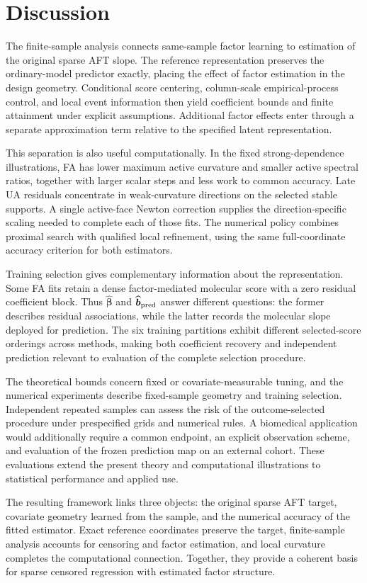 \section{Discussion}
\label{sec:discussion}
The finite-sample analysis connects same-sample factor learning to estimation of the original sparse AFT slope. The reference representation preserves the ordinary-model predictor exactly, placing the effect of factor estimation in the design geometry. Conditional score centering, column-scale empirical-process control, and local event information then yield coefficient bounds and finite attainment under explicit assumptions. Additional factor effects enter through a separate approximation term relative to the specified latent representation.

This separation is also useful computationally. In the fixed strong-dependence illustrations, FA has lower maximum active curvature and smaller active spectral ratios, together with larger scalar steps and less work to common accuracy. Late UA residuals concentrate in weak-curvature directions on the selected stable supports. A single active-face Newton correction supplies the direction-specific scaling needed to complete each of those fits. The numerical policy combines proximal search with qualified local refinement, using the same full-coordinate accuracy criterion for both estimators.

Training selection gives complementary information about the representation. Some FA fits retain a dense factor-mediated molecular score with a zero residual coefficient block. Thus $\widehat{\bm{\beta}}$ and $\widehat{\bm{b}}_{\rm pred}$ answer different questions: the former describes residual associations, while the latter records the molecular slope deployed for prediction. The six training partitions exhibit different selected-score orderings across methods, making both coefficient recovery and independent prediction relevant to evaluation of the complete selection procedure.

The theoretical bounds concern fixed or covariate-measurable tuning, and the numerical experiments describe fixed-sample geometry and training selection. Independent repeated samples can assess the risk of the outcome-selected procedure under prespecified grids and numerical rules. A biomedical application would additionally require a common endpoint, an explicit observation scheme, and evaluation of the frozen prediction map on an external cohort. These evaluations extend the present theory and computational illustrations to statistical performance and applied use.

The resulting framework links three objects: the original sparse AFT target, covariate geometry learned from the sample, and the numerical accuracy of the fitted estimator. Exact reference coordinates preserve the target, finite-sample analysis accounts for censoring and factor estimation, and local curvature completes the computational connection. Together, they provide a coherent basis for sparse censored regression with estimated factor structure.
